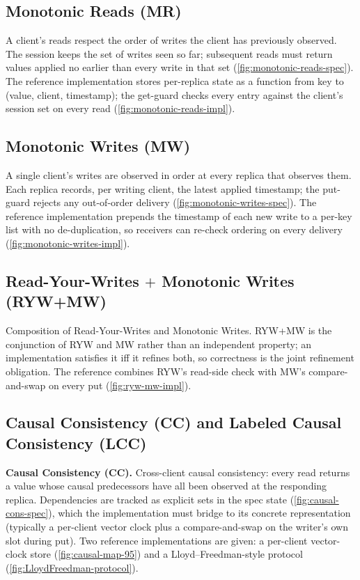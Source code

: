 \subsection{Monotonic Reads (MR)}
A client's reads respect the order of writes the client has previously observed. The session keeps the set of writes seen so far; subsequent reads must return values applied no earlier than every write in that set (\cref{fig:monotonic-reads-spec}). The reference implementation stores per-replica state as a function from key to (value, client, timestamp); the get-guard checks every entry against the client's session set on every read (\cref{fig:monotonic-reads-impl}).


\subsection{Monotonic Writes (MW)}
A single client's writes are observed in order at every replica that observes them. Each replica records, per writing client, the latest applied timestamp; the put-guard rejects any out-of-order delivery (\cref{fig:monotonic-writes-spec}). The reference implementation prepends the timestamp of each new write to a per-key list with no de-duplication, so receivers can re-check ordering on every delivery (\cref{fig:monotonic-writes-impl}).


\subsection{Read-Your-Writes $+$ Monotonic Writes (RYW+MW)}
Composition of Read-Your-Writes and Monotonic Writes. RYW+MW is the conjunction of RYW and MW rather than an independent property; an implementation satisfies it iff it refines both, so correctness is the joint refinement obligation. The reference combines RYW's read-side check with MW's compare-and-swap on every put (\cref{fig:ryw-mw-impl}).


\subsection{Causal Consistency (CC) and Labeled Causal Consistency (LCC)}
\textbf{Causal Consistency (CC).}
Cross-client causal consistency: every read returns a value whose causal predecessors have all been observed at the responding replica. Dependencies are tracked as explicit sets in the spec state (\cref{fig:causal-cons-spec}), which the implementation must bridge to its concrete representation (typically a per-client vector clock plus a compare-and-swap on the writer's own slot during put). Two reference implementations are given: a per-client vector-clock store (\cref{fig:causal-map-95}) and a Lloyd--Freedman-style protocol (\cref{fig:LloydFreedman-protocol}).

